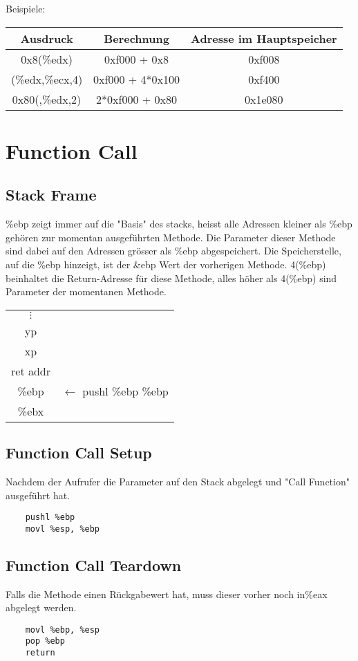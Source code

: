 \documentclass[a4paper, 11pt]{article}
\begin{document}
Beispiele:
\begin{tabular}{|c|c|c|}
	\hline
	Ausdruck & Berechnung & Adresse im Hauptspeicher \\\hline\hline
	0x8(\%edx) & 0xf000 + 0x8 & 0xf008 \\\hline
	(\%edx,\%ecx,4)&0xf000 + 4*0x100&0xf400\\\hline
	0x80(,\%edx,2)&2*0xf000 + 0x80 & 0x1e080\\\hline
\end{tabular}

\section{Function Call}
\subsection{Stack Frame}
\%ebp zeigt immer auf die "Basis" des stacks, heisst alle Adressen kleiner als \%ebp gehören zur momentan ausgeführten Methode. Die Parameter dieser Methode sind dabei auf den Adressen grösser als \%ebp abgespeichert. Die Speicherstelle, auf die \%ebp hinzeigt, ist der \&ebp Wert der vorherigen Methode. 4(\%ebp) beinhaltet die Return-Adresse für diese Methode, alles höher als 4(\%ebp) sind Parameter der momentanen Methode.\\
\begin{tabular}{|c|c}
	$\vdots$&\\\cline{0-0}
	yp\\\cline{0-0}
	xp\\\cline{0-0}
	ret addr\\\cline{0-0}
	\%ebp & $\leftarrow$ pushl \%ebp 			\%ebp\\\cline{0-0}
 	\%ebx\\\cline{0-0}
\end{tabular}

\subsection{Function Call Setup}
Nachdem der Aufrufer die Parameter auf den Stack abgelegt und "Call Function" ausgeführt hat.
\begin{lstlisting}
	pushl %ebp
	movl %esp, %ebp
\end{lstlisting}

 
\subsection{Function Call Teardown}
Falls die Methode einen Rückgabewert hat, muss dieser vorher noch in\%eax abgelegt werden.
\begin{lstlisting}
	movl %ebp, %esp
	pop %ebp
	return
\end{lstlisting}
\end{document}
